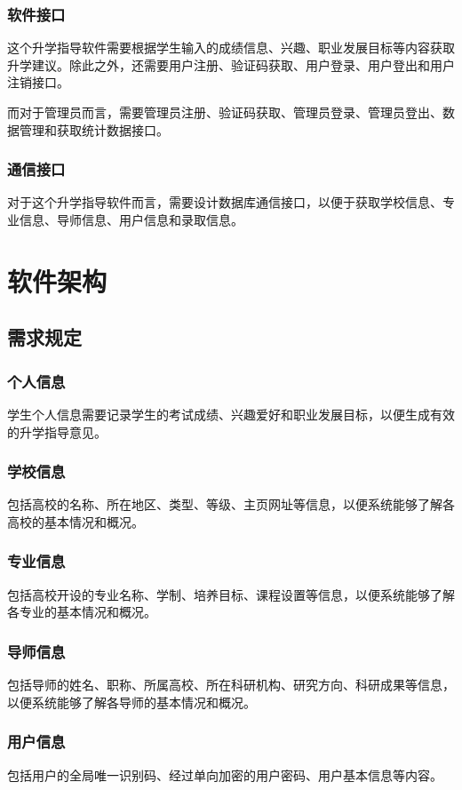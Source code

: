 \documentclass[UTF8]{ctexart}
\begin{document}
    \subsubsection{软件接口}
    这个升学指导软件需要根据学生输入的成绩信息、兴趣、职业发展目标等内容获取升学建议。除此之外，还需要用户注册、验证码获取、用户登录、用户登出和用户注销接口。

    而对于管理员而言，需要管理员注册、验证码获取、管理员登录、管理员登出、数据管理和获取统计数据接口。
    \subsubsection{通信接口}
    对于这个升学指导软件而言，需要设计数据库通信接口，以便于获取学校信息、专业信息、导师信息、用户信息和录取信息。

    \section{软件架构}
    \subsection{需求规定}
    \subsubsection{个人信息}
    学生个人信息需要记录学生的考试成绩、兴趣爱好和职业发展目标，以便生成有效的升学指导意见。
    \subsubsection{学校信息}
    包括高校的名称、所在地区、类型、等级、主页网址等信息，以便系统能够了解各高校的基本情况和概况。
    \subsubsection{专业信息}
    包括高校开设的专业名称、学制、培养目标、课程设置等信息，以便系统能够了解各专业的基本情况和概况。
    \subsubsection{导师信息}
    包括导师的姓名、职称、所属高校、所在科研机构、研究方向、科研成果等信息，以便系统能够了解各导师的基本情况和概况。
    \subsubsection{用户信息}
    包括用户的全局唯一识别码、经过单向加密的用户密码、用户基本信息等内容。
\end{document}
